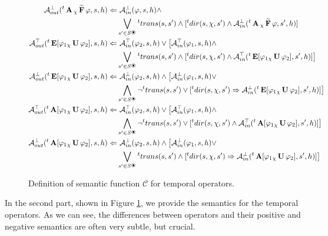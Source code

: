 \begin{figure}
{{\begin{align*}
		\assumeF_{out}(\withTime{t}\ctlA\dctlFW{\chi} \varphi, s, h)  \Leftarrow &\ \assumeF_{in}(\varphi, s, h) \land \\
		& \bigvee_{s' \in \dtsSrelevant} \withTime{t}trans(s,s') \land [\withTime{t}dir(s, \chi, s') \land \assumeF_{in}(\withTime{t}\ctlA\dctlFW{\chi} \varphi, s', h) ] \\
		\assumeT_{out}(\withTime{t}\ctlE[ \varphi_1 \dctlUl{\chi} \varphi_2], s, h) \Leftarrow &\ \assumeT_{in}(\varphi_2, s, h) \lor \big[ \assumeT_{in}(\varphi_1, s, h) \land \\
		& \bigvee_{s' \in \dtsSrelevant} \withTime{t}trans(s,s') \land [\withTime{t}dir(s, \chi, s') \land \assumeT_{in}(\withTime{t}\ctlE[ \varphi_1 \dctlUl{\chi} \varphi_2], s', h)] \big] \\
		\assumeF_{out}(\withTime{t}\ctlE[ \varphi_1 \dctlUl{\chi} \varphi_2], s, h) \Leftarrow &\ \assumeF_{in}(\varphi_2, s, h) \land \big[ \assumeF_{in}(\varphi_1, s, h) \lor \\
		& \bigwedge_{s' \in \dtsSrelevant} \neg\withTime{t}trans(s,s') \lor [\withTime{t}dir(s, \chi, s') \Rightarrow \assumeF_{in}(\withTime{t}\ctlE[ \varphi_1 \dctlUl{\chi} \varphi_2], s', h)] \big] \\
		\assumeT_{out}(\withTime{t}\ctlA[ \varphi_1 \dctlUl{\chi} \varphi_2], s, h) \Leftarrow &\ \assumeT_{in}(\varphi_2, s, h) \lor \big[ \assumeT_{in}(\varphi_1, s, h) \land \\
		& \bigwedge_{s' \in \dtsSrelevant} \neg\withTime{t}trans(s,s') \lor [\withTime{t}dir(s, \chi, s') \land \assumeT_{in}(\withTime{t}\ctlA[ \varphi_1 \dctlUl{\chi} \varphi_2], s', h)] \big] \\
		\assumeF_{out}(\withTime{t}\ctlA[ \varphi_1 \dctlUl{\chi} \varphi_2], s, h) \Leftarrow &\ \assumeF_{in}(\varphi_2, s, h) \land \big[ \assumeF_{in}(\varphi_1, s, h) \lor \\
		& \bigvee_{s' \in \dtsSrelevant} \withTime{t}trans(s,s') \land [\withTime{t}dir(s, \chi, s') \Rightarrow \assumeF_{in}(\withTime{t}\ctlA[ \varphi_1 \dctlUl{\chi} \varphi_2], s', h)] \big] \\
		\end{align*}
}}
	\caption{Definition of semantic function $\mathcal{C}$ for temporal operators.}
	\label{fig:assTemporal}
\end{figure}

In the second part, shown in Figure \ref{fig:assTemporal}, we provide the semantics for the temporal operators. As we can see, the differences between operators and their positive and negative semantics are often very subtle, but crucial.

